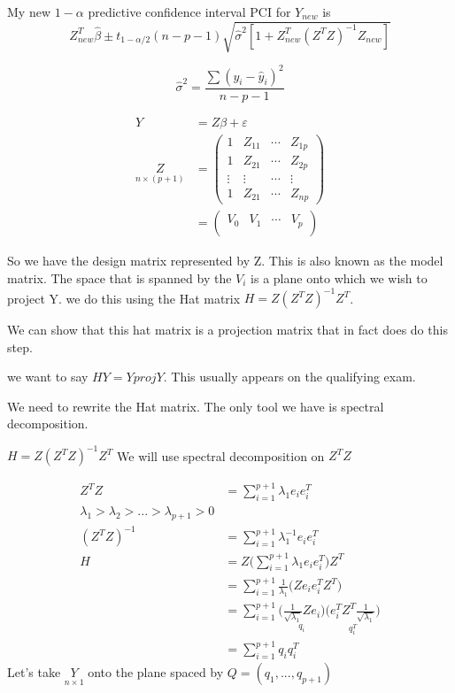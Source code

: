 My new $1-\alpha$ predictive confidence interval PCI for $Y_{new}$ is 
\[Z^T_{new}\hat{\beta}\pm t_{1-\alpha/2}(n-p-1)\sqrt{
\hat{\sigma}^2
[ 1+Z_{new}^T(Z^TZ)^{-1}Z_{new}]
}\]

\[\hat{\sigma}^2 = \frac{\sum (y_i-\hat{y}_i)^2}{n-p-1}\]

\begin{align*}
    Y &= Z\beta + \varepsilon \\
    \underset{n\times (p+1)}{Z} &=
    \left(
        \begin{array}{c|c|c|c}
          1 & Z_{11} & \cdots & Z_{1p}\\
          1 & Z_{21} & \cdots & Z_{2p}\\
          \vdots & \vdots & \cdots & \vdots\\
          1 & Z_{21} & \cdots & Z_{np}
        \end{array}
    \right)\\
    &= \left(
    \begin{array}{c|c|c|c}
      V_0 & V_1 & \cdots & V_p\\
    \end{array}
    \right)
\end{align*}

So we have the design matrix represented by Z. This is also known as the model matrix. The space that is spanned by the $V_i$ is a plane onto which we wish to project Y. we do this using the Hat matrix $H=Z(Z^TZ)^{-1}Z^T$.

We can show that this hat matrix is a projection matrix that in fact does do this step. 

we want to say $HY=Y proj Y$. This usually appears on the qualifying exam.

We need to rewrite the Hat matrix. The only tool we have is spectral decomposition.

$H=Z(Z^TZ)^{-1}Z^T$
We will use spectral decomposition on $Z^TZ$

\begin{align*}
    Z^TZ &= \sum_{i=1}^{p+1}\lambda_1e_ie_i^T\\
    \lambda_1>\lambda_2>...>
    \lambda_{p+1} >0\\
    (Z^TZ)^{-1} &= \sum_{i=1}^{p+1}\lambda_1 ^{-1}e_ie_i^T\\
    H &= Z \big(\sum_{i=1}^{p+1}\lambda_1e_ie_i^T\big) Z^T \\
    &= \sum_{i=1}^{p+1}\frac{1}{\lambda_1} \big(Ze_ie_i^T Z^T \big)\\
    &= \sum_{i=1}^{p+1}
    \big(\underset{q_i}{\frac{1}{\sqrt{\lambda_1}} Ze_i}\big)
    \big(
    \underset{q_i^T}{e_i^T Z^T \frac{1}{\sqrt{\lambda_1}}}
    \big) \\
    &=\sum_{i=1}^{p+1}q_iq_i^T
\end{align*}
Let's take $\underset{n \times 1}{Y}$ onto the plane spaced by $Q = (q_1,...,q_{p+1})$

